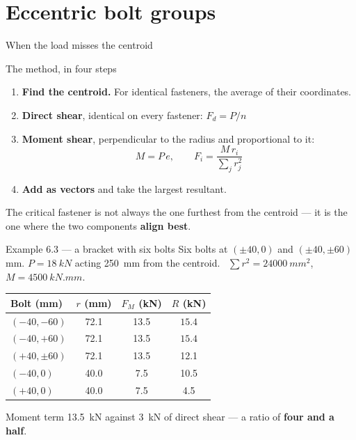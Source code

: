 \documentclass[aspectratio=169,10pt]{beamer}
\begin{document}
\section{Eccentric bolt groups}

\begin{frame}{When the load misses the centroid}
\centering
\resizebox{!}{5.8cm}{}
\end{frame}

\begin{frame}{The method, in four steps}
\begin{enumerate}
\item \textbf{Find the centroid.} For identical fasteners, the average of their coordinates.
\item \textbf{Direct shear}, identical on every fastener: \quad $F_d = P/n$
\item \textbf{Moment shear}, perpendicular to the radius and proportional to it:
  \[ M = P\,e, \qquad F_i = \frac{M\,r_i}{\sum_j r_j^{2}} \]
\item \textbf{Add as vectors} and take the largest resultant.
\end{enumerate}
\vfill
\begin{alertblock}{}
\centering
The critical fastener is \alert{not} always the one furthest from the centroid --- it is the one
where the two components \textbf{align best}.
\end{alertblock}
\end{frame}

\begin{frame}{Example 6.3 --- a bracket with six bolts}
Six bolts at $(\pm40,0)$ and $(\pm40,\pm60)$ mm. $P=\SI{18}{kN}$ acting \SI{250}{mm} from the
centroid. \ $\sum r^2 = \SI{24000}{mm^2}$, \ $M=\SI{4500}{kN.mm}$.
\vfill
\centering\small
\begin{tabular}{@{}lccc@{}}
\toprule
Bolt (mm) & $r$ (mm) & $F_M$ (kN) & $R$ (kN)\\
\midrule
$(-40,-60)$ & 72.1 & 13.5 & $\mathbf{15.4}$\\
$(-40,+60)$ & 72.1 & 13.5 & $\mathbf{15.4}$\\
$(+40,\pm60)$ & 72.1 & 13.5 & 12.1\\
$(-40,0)$ & 40.0 & 7.5 & 10.5\\
$(+40,0)$ & 40.0 & 7.5 & 4.5\\
\bottomrule
\end{tabular}
\vfill
\raggedright
Moment term \SI{13.5}{kN} against \SI{3}{kN} of direct shear --- a ratio of \textbf{four and a
half}.
\end{frame}
\end{document}
